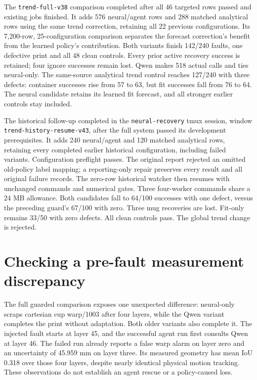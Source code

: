 \documentclass[10pt,letterpaper]{article}
\begin{document}
The \texttt{trend-full-v38} comparison completed after all 46 targeted
rows passed and existing jobs finished. It adds 576 neural/agent rows and
288 matched analytical rows using the same trend correction, retaining all
22 previous configurations. Its 7,200-row, 25-configuration comparison separates
the forecast correction's benefit from the learned policy's contribution.
Both variants finish 142/240 faults, one defective print and all 48 clean
controls. Every prior active recovery success is retained; four ignore successes
remain lost. Qwen makes 518 actual calls and ties neural-only. The same-source
analytical trend control reaches 127/240 with three defects: container successes
rise from 57 to 63, but fit successes fall from 76 to 64. The neural candidate
retains its learned fit forecast, and all stronger earlier controls stay included.

The historical follow-up completed in the \texttt{neural-recovery} tmux session,
window \texttt{trend-history-resume-v43}, after the full system passed its
development prerequisites. It adds
240 neural/agent and 120 matched analytical rows, retaining every completed
earlier historical configuration, including failed variants. Configuration
preflight passes. The original report rejected an omitted old-policy label
mapping; a reporting-only repair preserves every result and all original failure
records. The zero-row historical watcher then resumes with unchanged commands
and numerical gates. Three four-worker commands share a 24 MB allowance.
Both candidates fall to 64/100 successes with one defect, versus the preceding
guard's 67/100 with zero. Three mug recoveries are lost. Fit-only remains 33/50
with zero defects. All clean controls pass. The global trend change is rejected.

\clearpage
\section{Checking a pre-fault measurement discrepancy}

The full guarded comparison exposes one unexpected difference: neural-only
scraps cartesian cup warp/1003 after four layers, while the Qwen variant completes
the print without adaptation. Both older variants also complete it. The injected
fault starts at layer 45, and the successful agent run first consults Qwen at
layer 46. The failed run already reports a false warp alarm on layer zero and
an uncertainty of 45.959 mm on layer three. Its measured geometry has mean IoU
0.318 over those four layers, despite nearly identical physical motion tracking.
These observations do not establish an agent rescue or a policy-caused loss.
\end{document}

